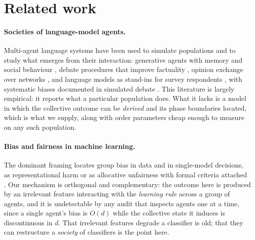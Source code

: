 \documentclass{article}
\begin{document}
\section{Related work}
\label{sec:related}

\paragraph{Societies of language-model agents.} Multi-agent language systems have
been used to simulate populations and to study what emerges from their
interaction: generative agents with memory and social behaviour
\citep{park2022social,park2023generative}, debate procedures that improve
factuality \citep{du2023debate}, opinion exchange over networks
\citep{chuang2024simulating}, and language models as stand-ins for survey
respondents \citep{argyle2023out,aher2023using}, with systematic biases documented
in simulated debate \citep{taubenfeld2024systematic}. This literature is largely
empirical: it reports what a particular population does. What it lacks is a model
in which the collective outcome can be \emph{derived} and its phase boundaries located,
which is what we supply, along with order parameters cheap enough to
measure on any such population.

\paragraph{Bias and fairness in machine learning.} The dominant framing locates
group bias in data and in single-model decisions, as representational harm
\citep{blodgett2020language,bender2021dangers} or as allocative unfairness with
formal criteria attached
\citep{dwork2012fairness,hardt2016equality,barocas2023fairness}. Our mechanism is
orthogonal and complementary: the outcome here is produced by an irrelevant
feature interacting with the \emph{learning rule} across a group of agents, and it
is undetectable by any audit that inspects agents one at a time, since a single
agent's bias is $O(d)$ while the collective state it induces is discontinuous in
$d$. That irrelevant features degrade a classifier is old; that they can
restructure a \emph{society} of classifiers is the point here.
\end{document}
